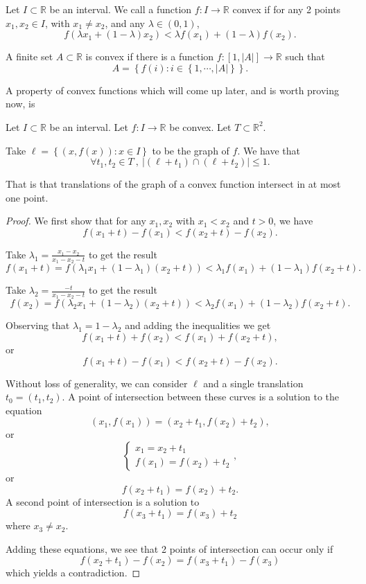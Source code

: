 \documentclass[12pt,reqno]{amsart}
\begin{document}
Let \(I \subset \mathbb{R} \) be an interval. 
    We call a function \(f: I \to \mathbb{R} \) convex if for
    any 2 points \(x_1,x_2 \in I\), with \(x_1 \neq x_2\), and any \(\lambda \in (0,1)\),
    \[
        f(\lambda x_1 + (1-\lambda)x_2) < \lambda f(x_1) + (1-\lambda)f(x_2)
    .\]

    A finite set \(A \subset \mathbb{R}\) is convex if there is a function \(f: [1, \left\lvert A \right\rvert ] \to \mathbb{R} \)
such that
\[
    A = \left\{ f(i) : i \in \left\{ 1, \cdots , \left\lvert A \right\rvert  \right\}  \right\} 
.\]

A property of convex functions which will come up later, and is worth proving now, is
\begin{lemma}
Let \(I \subset \mathbb{R} \) be an interval. Let \(f : I \to \mathbb{R} \) be convex. Let \(T \subset \mathbb{R} ^{2}\).

Take \(\ell  = \left\{ (x,f(x)) : x \in I \right\} \) to be the graph of \(f\). We have that
\[
    \forall t_1,t_2 \in T ~,~ \left\lvert \left( \ell + t_1 \right) \cap \left( \ell +  t_2 \right)  \right\rvert   \leq  1
.\]

That is that translations of the graph of a convex function intersect in at most one point.
\end{lemma}

\begin{proof}
We first show that for any \(x_1, x_2\) with \(x_1 < x_2\) and \(t > 0\), we have
\[
    f(x_1 + t) - f(x_1) < f(x_2 + t) - f(x_2)
.\]

Take \(\lambda_1 = \frac{x_1 - x_2}{x_1 -x_2 -t} \) to get the result
\[
    f(x_1 + t)  = f(\lambda_1 x_1 + \left( 1- \lambda_1 \right) \left( x_2 + t \right) ) < \lambda_1 f(x_1) + \left( 1 - \lambda_1 \right) f(x_2 + t)
.\]

Take \(\lambda_2 = \frac{-t}{x_1-x_2-t} \) to get the result
\[
    f(x_2) = f(\lambda_2x_1 + \left( 1 - \lambda_2 \right) \left( x_2 + t \right) ) < \lambda_2 f(x_1) + \left( 1- \lambda_2 \right) f(x_2+ t) 
.\]

Observing that \(\lambda_1 = 1-\lambda_2\) and adding the inequalities we get
\[
    f(x_1 + t) + f(x_2) < f(x_1) + f(x_2 + t)
,\]
or
\[
    f(x_1 + t) - f(x_1) < f(x_2 + t) - f(x_2)
.\]

Without loss of generality, we can consider \(\ell\) and a single translation \(t_0 = \left( t_1,t_2 \right) \).
A point of intersection between these curves is a solution to the equation
\[
    (x_1, f(x_1)) = (x_2 + t_1, f(x_2) + t_2)
,\]
or
\[
\begin{cases}
x_1 = x_2 + t_1 \\
f(x_1) = f(x_2) + t_2
\end{cases}
,\]
or
\[
    f(x_2 + t_1) = f(x_2) + t_2
.\]
A second point of intersection is a solution to
\[
    f(x_3 + t_1) = f(x_3) + t_2
\]
where \(x_3 \neq x_2\).

Adding these equations, we see that 2 points of intersection can occur only if
\[
    f(x_2 + t_1) - f(x_2) = f(x_3 + t_1)- f(x_3)
\]
which yields a contradiction.

\end{proof}
\end{document}
